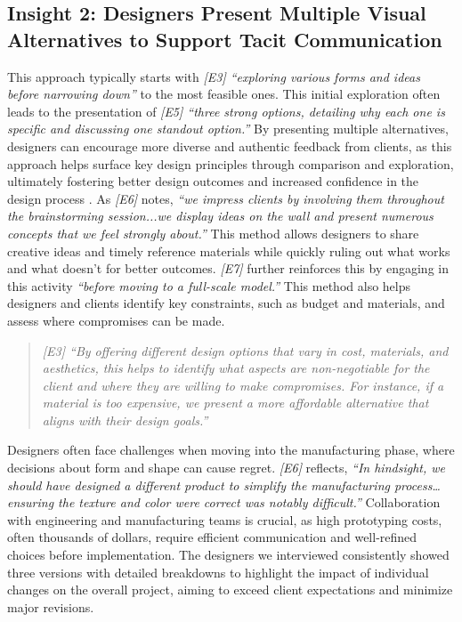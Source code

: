\subsection{Insight 2: Designers Present Multiple Visual Alternatives to Support Tacit Communication}
This approach typically starts with \textit{[E3] “exploring various forms and ideas before narrowing down”} to the most feasible ones. This initial exploration often leads to the presentation of \textit{[E5] “three strong options, detailing why each one is specific and discussing one standout option.”} By presenting multiple alternatives, designers can encourage more diverse and authentic feedback from clients, as this approach helps surface key design principles through comparison and exploration, ultimately fostering better design outcomes and increased confidence in the design process \cite{tohidi2006getting, dow2010parallel}. As \textit{[E6]} notes, \textit{“we impress clients by involving them throughout the brainstorming session...we display ideas on the wall and present numerous concepts that we feel strongly about.”} This method allows designers to share creative ideas and timely reference materials while quickly ruling out what works and what doesn’t for better outcomes. \textit{[E7]} further reinforces this by engaging in this activity \textit{“before moving to a full-scale model.”} This method also helps designers and clients identify key constraints, such as budget and materials, and assess where compromises can be made. \begin{quote}\textit{[E3] “By offering different design options that vary in cost, materials, and aesthetics, this helps to identify what aspects are non-negotiable for the client and where they are willing to make compromises. For instance, if a material is too expensive, we present a more affordable alternative that aligns with their design goals.”}\end{quote}

Designers often face challenges when moving into the manufacturing phase, where decisions about form and shape can cause regret. \textit{[E6]} reflects, \textit{“In hindsight, we should have designed a different product to simplify the manufacturing process…ensuring the texture and color were correct was notably difficult.”} Collaboration with engineering and manufacturing teams is crucial, as high prototyping costs, often thousands of dollars, require efficient communication and well-refined choices before implementation. The designers we interviewed consistently showed three versions with detailed breakdowns to highlight the impact of individual changes on the overall project, aiming to exceed client expectations and minimize major revisions.

